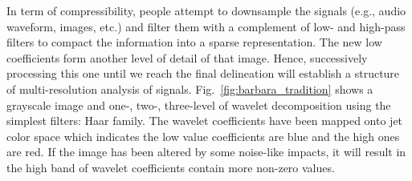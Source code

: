 In term of compressibility,  people attempt to downsample the signals (e.g., audio waveform, images, etc.) and filter them with a complement of low- and high-pass filters to compact the information into a sparse representation. 
The new low coefficients form another level of detail of that image. 
Hence, successively processing this one until we reach the final delineation will establish a structure of multi-resolution analysis of signals. 
Fig.~\ref{fig:barbara_tradition} shows a grayscale image and one-, two-, three-level of wavelet decomposition using the simplest filters: Haar family. 
The wavelet coefficients have been mapped onto jet color space which indicates the low value coefficients are blue and the high ones are red. 
If the image has been altered by some noise-like impacts, it will result in the high band of wavelet coefficients contain more non-zero values.



